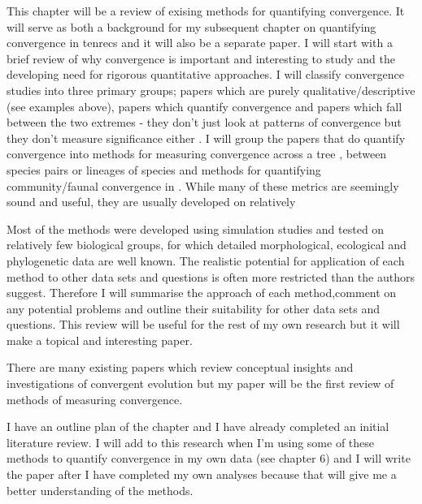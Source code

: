 \documentclass[12pt,a4paper]{article}
\begin{document}
\begin{enumerate}
This chapter will be a review of exising methods for quantifying convergence. It will serve as both a background for my subsequent chapter on quantifying convergence in tenrecs and it will also be a separate paper. 
I will start with a brief review of why convergence is important and interesting to study and the developing need for rigorous quantitative approaches. I will classify convergence studies into three primary groups; papers which are purely qualitative/descriptive (see examples above), papers which quantify convergence and papers which fall between the two extremes - they don't just look at patterns of convergence but they don't measure significance either  \citep[e.g.][]{Tseng2013, Kawahara2013, Wroe2007, Jones2007, Clark2005}. I will group the papers that do quantify convergence into methods for measuring convergence across a tree \citep{Stayton2008}, between species pairs \citep{Muschick2012, Stayton2006, Harmon2005} or lineages of species \citep{Revell2007} and methods for quantifying community/faunal convergence in \citep{Burd2014, Alvarado2013, Ingram2013, Mahler2013, Moen2013, Segar2013, Elias2008, Melville2006}.  
While many of these metrics are seemingly sound and useful, they are usually developed on relatively 


Most of the methods were developed using simulation studies and tested on relatively few biological groups, for which detailed morphological, ecological and phylogenetic data are well known. The realistic potential for application of each method to other data sets and questions is often more restricted than the authors suggest. Therefore I will summarise the approach of each method,comment on any potential problems and outline their suitability for other data sets and questions. This review will be useful for the rest of my own research but it will make a topical and interesting paper.  

There are many existing papers which review conceptual insights and investigations of convergent evolution \citep[e.g.][]{Losos2011, Conway-Morris2006, Scheffer2006} but my paper will be the first review of methods of measuring convergence. 

I have an outline plan of the chapter and I have already completed an initial literature review. I will add to this research when I'm using some of these methods to quantify convergence in my own data (see chapter 6) and I will write the paper after I have completed my own analyses because that will give me a better understanding of the methods.


\end{enumerate}
\end{document}
